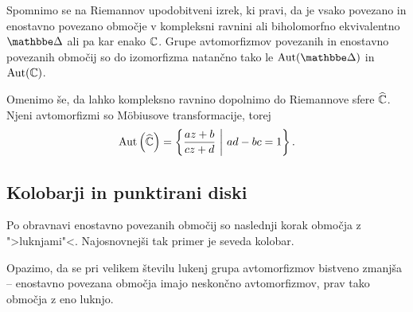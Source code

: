 Spomnimo se na Riemannov upodobitveni izrek, ki pravi, da je
vsako povezano in enostavno povezano območje v kompleksni ravnini
ali biholomorfno ekvivalentno $\dsk$ ali pa kar enako $\mathbb{C}$. Grupe
avtomorfizmov povezanih in enostavno povezanih območij so do
izomorfizma natančno tako le $\Aut(\dsk)$ in $\operatorname{Aut}(\mathbb{C})$.

Omenimo še, da lahko kompleksno ravnino dopolnimo do Riemannove
sfere $\widehat{\mathbb{C}}$. Njeni avtomorfizmi so Möbiusove transformacije, torej
\[
\operatorname{Aut} \left(\widehat{\mathbb{C}}\right) = \left\{\frac{az + b}{cz + d}~\middle\vert~ad - bc = 1\right\}.
\]

\subsection{Kolobarji in punktirani diski}

Po obravnavi enostavno povezanih območij so naslednji korak
območja z ">luknjami"<. Najosnovnejši tak primer je seveda
kolobar.


Opazimo, da se pri velikem številu lukenj grupa avtomorfizmov
bistveno zmanjša -- enostavno povezana območja imajo neskončno
avtomorfizmov, prav tako območja z eno luknjo.
